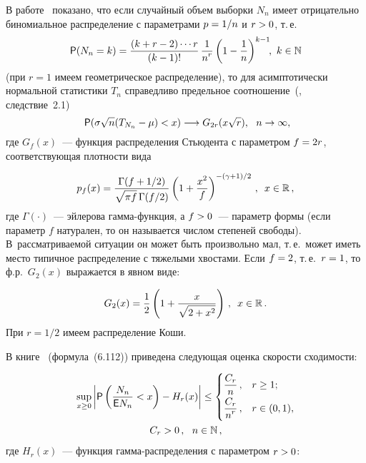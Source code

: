 \begin{multicols}{2}
В работе~\cite{3-ben} показано, что если случайный объем выборки $N_n$
имеет отрицательно биномиальное распределение с параметрами $p \hm=
1/n$ и $r \hm> 0$,  т.\,е.\
$$
{{\sf P}}(N_n = k) = \displaystyle\frac{\displaystyle (k+r-2)\cdots r\mathstrut}{\displaystyle (k-1)!\mathstrut}\, \displaystyle\frac{\displaystyle 1\mathstrut}{\displaystyle n^r\mathstrut} \left(1
- \displaystyle\frac{\displaystyle 1\mathstrut}{\displaystyle n\mathstrut}\right)^{k-1}\!\!, \   k\in\mathbb N
$$
(при $r=1$ имеем геометрическое распределение), то для
асимптотически нормальной статистики $T_n$ справедливо предельное
соотношение~(\cite{3-ben}, следствие~2.1)
\begin{equation}
{{\sf P}}(\sigma\sqrt{n} (T_{N_n} - \mu) < x)\longrightarrow G_{2r}(x
\sqrt r), \ \  n\to\infty,\!\! \label{e5.8-ben}
\end{equation}
где $G_{f}(x)$~--- функция распределения Стьюдента с параметром $f \hm= 2r$, соответствующая 
плотности вида

\noindent
$$
p_{f}(x) = \displaystyle\frac{\displaystyle \Gamma(f+1/2)\mathstrut}{\displaystyle \sqrt{\pi f}\, \Gamma(f/2)\mathstrut}\left(
1+\displaystyle\frac{\displaystyle x^2\mathstrut}{\displaystyle f\mathstrut}\right)^{-(\gamma+1)/2}\,,\enskip   x\in\mathbb R\,,
$$
где $\Gamma(\cdot)$~--- эйлерова гам\-ма-функ\-ция, а $f\hm>0$~--- параметр
формы (если параметр $f$ натурален, то он называется числом степеней
свободы). В~рас\-смат\-ри\-ва\-емой ситуации он может быть произвольно мал,
т.\,е.\ может иметь место типичное распределение с тяжелыми
хвостами. Если $f\hm=2$, т.\,е.\ $r\hm=1$, то ф.р.\ $G_2(x)$ выражается в
явном виде:

\noindent
$$
G_2(x) = \displaystyle\frac{\displaystyle 1\mathstrut}{\displaystyle 2\mathstrut}\left( 1+\displaystyle\frac{\displaystyle x\mathstrut}{\displaystyle \sqrt{2+x^2}\mathstrut} \right)\,, \enskip  x\in\mathbb R\,.
$$
При $r=1/2$ имеем распределение Коши.

В книге~\cite{22-ben} (формула~(6.112)) приведена следующая оценка
скорости сходимости:

\noindent
\begin{multline}
\sup_{x\ge0} \left|{{\sf P}}\left(\displaystyle\frac{\displaystyle N_n\mathstrut}{\displaystyle {\sf E} N_n\mathstrut} <  x\right) -
H_r(x)\right| \leq 
\begin{cases}
\displaystyle\displaystyle\frac{\displaystyle C_r\mathstrut}{\displaystyle n\mathstrut}\,, &  r \ge 1;\\
\displaystyle\displaystyle\frac{\displaystyle C_r\mathstrut}{\displaystyle n^r\mathstrut}\,, &  r \in (0,1),
\end{cases}\\  C_r > 0\,,\ \
  n\in\mathbb N\,,\label{e5.9-ben}
\end{multline}
где $H_r(x)$~--- функция гам\-ма-рас\-пре\-де\-ле\-ния с параметром $r \hm> 0$:


\end{multicols}
